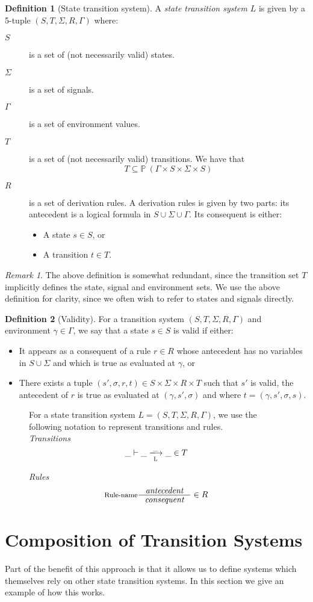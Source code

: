 \documentclass[11pt,a4paper]{article}
\newcommand{\powerset}[1]{\mathbb{P}~#1}
\newcommand{\trans}[2]{\xlongrightarrow[\textsc{#1}]{#2}}
\theoremstyle{definition}
\newtheorem{definition}{Definition}[section]
\theoremstyle{remark}
\newtheorem{remark}{Remark}[section]
\begin{document}
\begin{definition}[State transition system]
A \textit{state transition system} $L$ is given by a 5-tuple $(S, T, \Sigma, R, \Gamma)$
where:
\begin{description}
\item[$S$] is a set of (not necessarily valid) states.
\item[$\Sigma$] is a set of signals.
\item[$\Gamma$] is a set of environment values.
\item[$T$] is a set of (not necessarily valid) transitions. We have
  that \[T\subseteq\powerset{(\Gamma\times S\times\Sigma\times S)}\]
\item[$R$] is a set of derivation rules. A derivation rules is given by two
  parts: its antecedent is a logical formula in $S\cup\Sigma\cup\Gamma$. Its
  consequent is either:
  \begin{itemize}
  \item A state $s\in S$, or
  \item A transition $t\in T$.
  \end{itemize}
\end{description}
\end{definition}
\begin{remark}
  The above definition is somewhat redundant, since the transition set $T$
  implicitly defines the state, signal and environment sets. We use the above
  definition for clarity, since we often wish to refer to states and signals directly.
\end{remark}
\begin{definition}[Validity]
  For a transition system $(S, T, \Sigma, R, \Gamma)$ and environment $\gamma\in\Gamma$, we say that a state $s\in
  S$ is valid if either:
\begin{itemize}
\item It appears as a consequent of a rule $r\in R$ whose antecedent has no
  variables in $S\cup\Sigma$ and which is true as evaluated at $\gamma$, or
\item There exists a tuple $(s', \sigma, r, t)\in S\times\Sigma\times R \times
  T$ such that $s'$ is valid, the antecedent of $r$ is true as evaluated at $(\gamma, s',
  \sigma)$ and where $t=(\gamma, s', \sigma, s)$.
\end{itemize}
\end{definition}

\begin{figure}[h]
  \label{fig:notation}
  For a state transition system $L=(S,T,\Sigma, R, \Gamma)$, we use the
  following notation to represent transitions and rules. \\

  \textit{Transitions}
  \[ \_ \vdash \_ \trans{L}{\_} \_ \in T \]

  \textit{Rules}
  \[ \inference[Rule-name]
     {\textit{antecedent}}
     {\textit{consequent}}
     \in R
  \]
\end{figure}
\section{Composition of Transition Systems}

Part of the benefit of this approach is that it allows us to define systems
which themselves rely on other state transition systems. In this section we
give an example of how this works.
\end{document}
